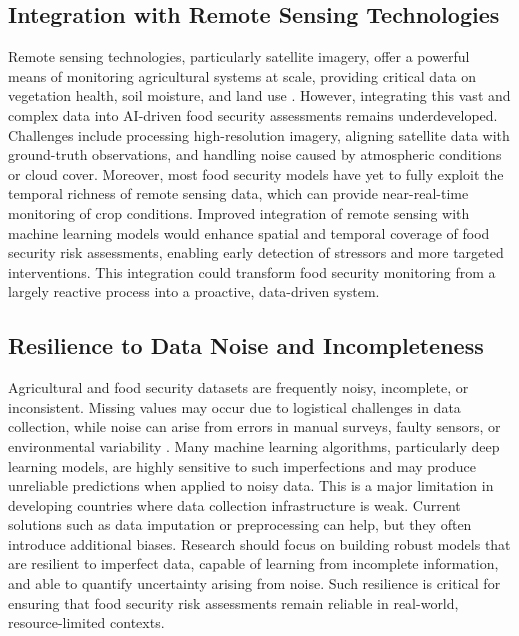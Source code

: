 \documentclass[preprint,12pt]{elsarticle}
\begin{document}
	\subsection{Integration with Remote Sensing Technologies}
	
	Remote sensing technologies, particularly satellite imagery, offer a
	powerful means of monitoring agricultural systems at scale, providing
	critical data on vegetation health, soil moisture, and land use \cite{ref90}.
	However, integrating this vast and complex data into AI-driven food
	security assessments remains underdeveloped. Challenges include
	processing high-resolution imagery, aligning satellite data with
	ground-truth observations, and handling noise caused by atmospheric
	conditions or cloud cover. Moreover, most food security models have yet
	to fully exploit the temporal richness of remote sensing data, which can
	provide near-real-time monitoring of crop conditions. Improved
	integration of remote sensing with machine learning models would enhance
	spatial and temporal coverage of food security risk assessments,
	enabling early detection of stressors and more targeted interventions.
	This integration could transform food security monitoring from a largely
	reactive process into a proactive, data-driven system.
	
	\subsection{Resilience to Data Noise and Incompleteness}
	
	Agricultural and food security datasets are frequently noisy,
	incomplete, or inconsistent. Missing values may occur due to logistical
	challenges in data collection, while noise can arise from errors in
	manual surveys, faulty sensors, or environmental variability \cite{ref91}.
	Many machine learning algorithms, particularly deep learning models, are
	highly sensitive to such imperfections and may produce unreliable
	predictions when applied to noisy data. This is a major limitation in
	developing countries where data collection infrastructure is weak.
	Current solutions such as data imputation or preprocessing can help, but
	they often introduce additional biases. Research should focus on
	building robust models that are resilient to imperfect data, capable of
	learning from incomplete information, and able to quantify uncertainty
	arising from noise. Such resilience is critical for ensuring that food
	security risk assessments remain reliable in real-world,
	resource-limited contexts.
	
\end{document}

